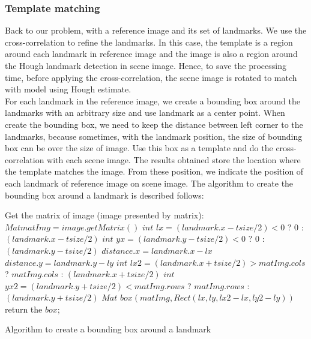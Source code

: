 \subsubsection{Template matching}
Back to our problem, with a reference image and its set of landmarks. We use the cross-correlation to refine the landmarks. In this case, the template is a region around each landmark in reference image and the image is also a region around the Hough landmark detection in scene image. Hence, to save the processing time, before applying the cross-correlation, the scene image is rotated to match with model using Hough estimate.\\[0.2cm]
For each landmark in the reference image, we create a bounding box around the landmarks with an arbitrary size and use landmark as a center point. When create the bounding box, we need to keep the distance between left corner to the landmarks, because sometimes, with the landmark position, the size of bounding box can be over the size of image. Use this box as a template and do the cross-correlation with each scene image. The results obtained store the location where the template matches the image. From these position, we indicate the position of each landmark of reference image on scene image. The algorithm to create the bounding box around a landmark is described follows:\\[0.2cm]
\begin{algorithm}[H]
\Indm 
{}
\Indp
Get the matrix of image (image presented by matrix): $Mat matImg = image.getMatrix()$\;
$int$ $lx = (landmark.x - tsize/2) < 0$ ? $0$ : $(landmark.x - tsize/2)$\;
$int$ $yx = (landmark.y - tsize/2) < 0$ ? $0$ : $(landmark.y - tsize/2)$\;
$distance.x = landmark.x - lx$\;
$distance.y = landmark.y - ly$\;
$int$ $lx2 = (landmark.x + tsize/2) > matImg.cols$ ? $matImg.cols$ : $(landmark.x + tsize/2)$\;
$int$ $yx2 = (landmark.y + tsize/2) < matImg.rows$ ? $matImg.rows$ : $(landmark.y + tsize/2)$\;
$Mat$ $box(matImg,Rect(lx,ly,lx2 - lx, ly2 - ly))$\;
return the $box$;
\caption{Algorithm to create a bounding box around a landmark}
\end{algorithm}~\\[0.2cm]
